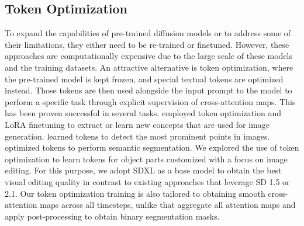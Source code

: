 \subsection{Token Optimization}
To expand the capabilities of pre-trained diffusion models or to address some of their limitations, they either need to be re-trained or finetuned.
However, these approaches are computationally expensive due to the large scale of these models and the training datasets.
An attractive alternative is token optimization, where the pre-trained model is kept frozen, and special textual tokens are optimized instead.
Those tokens are then used alongside the input prompt to the model to perform a specific task through explicit supervision of cross-attention maps.
This has been proven successful in several tasks. \citep{valevski2023unitune,gal2022textual,avrahami2023break,safaee2024clic} employed token optimization and LoRA finetuning to extract or learn new concepts that are used for image generation.
\citep{hedlin2023keypoints} learned tokens to detect the most prominent points in images. 
\citep{marcos2024ovam,khani2024slime} optimized tokens to perform semantic segmentation.
We explored the use of token optimization to learn tokens for object parts customized with a focus on image editing.
For this purpose, we adopt SDXL \citep{podell2024sdxl} as a base model to obtain the best visual editing quality in contrast to existing approaches that leverage SD 1.5 or 2.1.
Our token optimization training is also tailored to obtaining smooth cross-attention maps across all timesteps, unlike 
\citep{marcos2024ovam,khani2024slime} that aggregate all attention maps and apply post-processing to obtain binary segmentation masks.